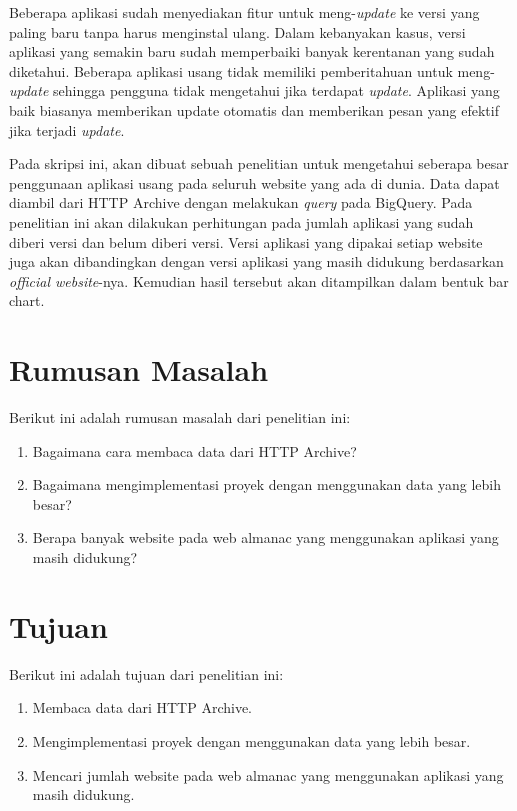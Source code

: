 Beberapa aplikasi sudah menyediakan fitur untuk meng-\textit{update} ke versi yang paling baru tanpa harus menginstal ulang. Dalam kebanyakan kasus, versi aplikasi yang semakin baru sudah memperbaiki banyak kerentanan yang sudah diketahui. Beberapa aplikasi usang tidak memiliki pemberitahuan untuk meng-\textit{update} sehingga pengguna tidak mengetahui jika terdapat \textit{update}. Aplikasi yang baik biasanya memberikan update otomatis dan memberikan pesan yang efektif jika terjadi \textit{update}. 

Pada skripsi ini, akan dibuat sebuah penelitian untuk mengetahui seberapa besar penggunaan aplikasi usang pada seluruh website yang ada di dunia. Data dapat diambil dari HTTP Archive dengan melakukan \textit{query} pada BigQuery. Pada penelitian ini akan dilakukan perhitungan pada jumlah aplikasi yang sudah diberi versi dan belum diberi versi. Versi aplikasi yang dipakai setiap website juga akan dibandingkan dengan versi aplikasi yang masih didukung berdasarkan \textit{official website}-nya. Kemudian hasil tersebut akan ditampilkan dalam bentuk bar chart.


\section{Rumusan Masalah}
\label{sec:rumusan}
Berikut ini adalah rumusan masalah dari penelitian ini:
\begin{enumerate}
	\item Bagaimana cara membaca data dari HTTP Archive?
	\item Bagaimana mengimplementasi proyek \cite{pascal} dengan menggunakan data yang lebih besar?
	\item Berapa banyak website pada web almanac yang menggunakan aplikasi  yang masih didukung?
\end{enumerate}


\section{Tujuan}
\label{sec:tujuan}
Berikut ini adalah tujuan dari penelitian ini:
\begin{enumerate}
	\item Membaca data dari HTTP Archive.
	\item Mengimplementasi proyek \cite{pascal} dengan menggunakan data yang lebih besar.
	\item Mencari jumlah website pada web almanac yang menggunakan aplikasi yang masih didukung.
\end{enumerate}


